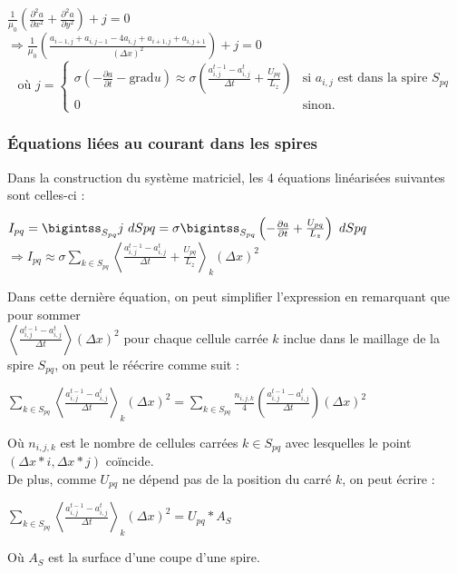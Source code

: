 \documentclass[11pt]{article}
\begin{document}
\begin{center}
    $\frac{1}{\mu_0} \left( \frac{\partial^2a}{\partial x^2} + \frac{\partial^2a}{\partial y^2} \right) + j = 0$ \\
    $\Longrightarrow \frac{1}{\mu_0} \left(\frac{a_{i-1,j} + a_{i,j-1} - 4a_{i,j} + a_{i+1,j} + a_{i,j+1}}{ \left(\Delta x\right)^2} \right) + j = 0 $ 
    $$ \textrm{où }
    j = \left\{
        \begin{array}{ll}
            \sigma \left( - \frac{\partial a}{\partial t} - \mbox{grad}u\right) \approx \sigma \left(\frac{a_{i,j}^{t-1} - a_{i,j}^t}{\Delta t} + \frac{U_{pq}}{L_z} \right) & \mbox{si } a_{i,j} \mbox{ est dans la spire } S_{pq} \\
            0 & \mbox{sinon.}
        \end{array}
    \right.
    $$
\end{center}

\subsubsection{Équations liées au courant dans les spires}
Dans la construction du système matriciel, les 4 équations linéarisées suivantes sont celles-ci :
\begin{center}
    $I_{pq} = \bigintss_{S_{pq}}j~dS{pq} = \sigma\bigintss_{S_{pq}} \left(-\frac{\partial a}{\partial t} + \frac{U_{pq}}{L_z} \right)~dS{pq}$ \\
    $\Longrightarrow I_{pq} \approx \sigma \underset{k\in S_{pq}}{\sum} \left< \frac{a_{i,j}^{t-1} - a_{i,j}^t}{\Delta t} + \frac{U_{pq}}{L_z}\right>_k \left(\Delta x\right)^2 $ \\
\end{center}
Dans cette dernière équation, on peut simplifier l'expression en remarquant que pour sommer \\ $\left<\frac{a_{i,j}^{t-1} - a_{i,j}^t}{\Delta t}\right>\left(\Delta x\right)^2$ pour chaque cellule carrée $k$ inclue dans le maillage de la spire $S_{pq}$, on peut le réécrire comme suit :
\begin{center}
    $\underset{k\in S_{pq}}{\sum} \left< \frac{a_{i,j}^{t-1} - a_{i,j}^t}{\Delta t}\right>_k \left(\Delta x\right)^2= \underset{k\in S_{pq}}{\sum} \frac{n_{i,j,k}}{4}\left(\frac{ a_{i,j}^{t-1} - a_{i,j}^t}{\Delta t} \right)\left(\Delta x\right)^2$
\end{center}
Où $n_{i,j,k} $ est le nombre de cellules carrées $k \in S_{pq}$ avec lesquelles le point $(\Delta x*i,\Delta x*j)$ coïncide.\\
De plus, comme $U_{pq}$ ne dépend pas de la position du carré $k$, on peut écrire :
\begin{center}
    $\underset{k\in S_{pq}}{\sum} \left< \frac{a_{i,j}^{t-1} - a_{i,j}^t}{\Delta t}\right>_k\left(\Delta x\right)^2 = U_{pq} * A_S$
\end{center}
Où $A_S$ est la surface d'une coupe d'une spire.
\end{document}
